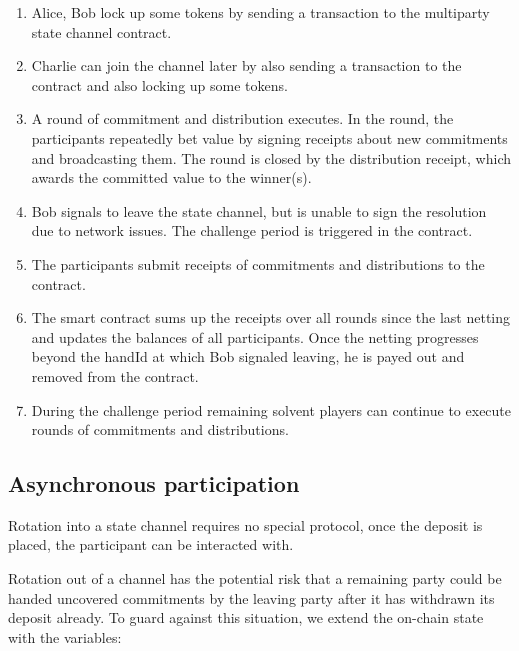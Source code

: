 \begin{enumerate}
\item Alice, Bob lock up some tokens by sending a transaction to the multiparty state channel contract.
\item Charlie can join the channel later by also sending a transaction to the contract and also locking up some tokens.
\item A round of commitment and distribution executes. In the round, the participants repeatedly bet value by signing receipts about new commitments and broadcasting them. The round is  closed by the distribution receipt, which awards the committed value to the winner(s).
\item Bob signals to leave the state channel, but is unable to sign the resolution due to network issues. The challenge period is triggered in the contract.
\item The participants submit receipts of commitments and distributions to the contract.
\item The smart contract sums up the receipts over all rounds since the last netting and updates the balances of all participants. Once the netting progresses beyond the handId at which Bob signaled leaving, he is payed out and removed from the contract.
\item During the challenge period remaining solvent players can continue to execute rounds of commitments and distributions.
\end{enumerate}

\subsection{Asynchronous participation}

Rotation into a state channel requires no special protocol, once the deposit is placed, the participant can be interacted with.

Rotation out of a channel has the potential risk that a remaining party could be handed uncovered commitments by the leaving party after it has withdrawn its deposit already. To guard against this situation, we extend the on-chain state with the variables:


